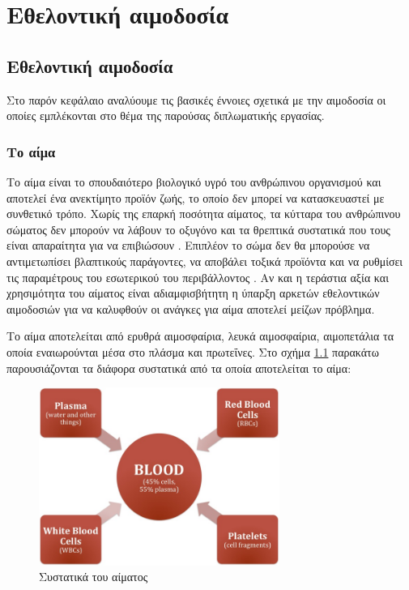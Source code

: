 \graphicspath{ {Figures/blood_donation/} }

\chapter{Εθελοντική αιμοδοσία}\label{ch:Βlood Donations}

\section{Εθελοντική αιμοδοσία}
	Στο παρόν κεφάλαιο αναλύουμε τις βασικές έννοιες σχετικά με την αιμοδοσία οι οποίες εμπλέκονται στο θέμα της παρούσας διπλωματικής εργασίας.
	\subsection{Το αίμα}
	Το αίμα είναι το σπουδαιότερο βιολογικό υγρό του ανθρώπινου οργανισμού και αποτελεί ένα ανεκτίμητο προϊόν ζωής, το οποίο δεν μπορεί να κατασκευαστεί με συνθετικό τρόπο. Χωρίς της επαρκή ποσότητα αίματος, τα κύτταρα του ανθρώπινου σώματος δεν μπορούν να λάβουν το οξυγόνο και τα θρεπτικά συστατικά που τους είναι απαραίτητα για να επιβιώσουν \cite{aboutBlood}. Επιπλέον το σώμα δεν θα μπορούσε να αντιμετωπίσει βλαπτικούς παράγοντες, να αποβάλει τοξικά προϊόντα και να ρυθμίσει τις παραμέτρους του εσωτερικού του περιβάλλοντος \cite{circulatorySystem}. Αν και η τεράστια αξία και χρησιμότητα του αίματος είναι αδιαμφισβήτητη η ύπαρξη αρκετών εθελοντικών αιμοδοσιών για να καλυφθούν οι ανάγκες για αίμα αποτελεί μείζων πρόβλημα.
	
	Το αίμα αποτελείται από ερυθρά αιμοσφαίρια, λευκά αιμοσφαίρια, αιμοπετάλια τα οποία εναιωρούνται μέσα στο πλάσμα και πρωτεΐνες. Στο σχήμα \ref{fig:basic_blood_diagram}  παρακάτω παρουσιάζονται τα διάφορα συστατικά από τα οποία αποτελείται το αίμα:
	\begin{figure}[h]
	    \centering
	    \includegraphics[width=0.7\textwidth]{basic_blood_diagram.jpg}
	    \caption{Συστατικά του αίματος}
	    \label{fig:basic_blood_diagram}
	\end{figure}
	 
